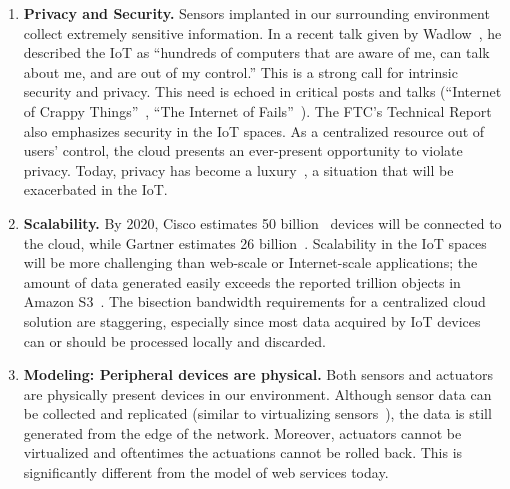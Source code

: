 \begin{enumerate}

\item \textbf{Privacy and Security.} Sensors implanted in our surrounding
  environment collect extremely sensitive information.  In a recent talk given
  by Wadlow~\cite{wadlow}, he described the IoT as ``hundreds of computers that
  are aware of me, can talk about me, and are out of my control.''  This is a
  strong call for intrinsic security and privacy.  This need is echoed in
  critical posts and talks (``Internet of Crappy
  Things''~\cite{alex2015internet}, ``The Internet of
  Fails''~\cite{stanislav2014the}).  The FTC's Technical
  Report~\cite{ftc2015internet} also emphasizes security in the IoT spaces.  As
  a centralized resource out of users' control, the cloud presents an
  ever-present opportunity to violate privacy.  Today, privacy has become a
  luxury~\cite{angwin2014has}, a situation that will be exacerbated in the IoT.

\item \textbf{Scalability.} By 2020, Cisco estimates 50
  billion~\cite{evans2011internet} devices will be connected to the cloud, while
  Gartner estimates 26 billion~\cite{middleton2013forecast}. Scalability in the
  IoT spaces will be more challenging than web-scale or Internet-scale
  applications; the amount of data generated easily exceeds the reported
  trillion objects in Amazon S3~\cite{barr2013amazon}. The bisection bandwidth
  requirements for a centralized cloud solution are staggering, especially since
  most data acquired by IoT devices can or should be processed locally and
  discarded.

\item \textbf{Modeling: Peripheral devices are physical.}  Both sensors and
  actuators are physically present devices in our environment.  Although sensor
  data can be collected and replicated (similar to virtualizing
  sensors~\cite{yuriyama2010sensor}), the data is still generated from the edge
  of the network.  Moreover, actuators cannot be virtualized and oftentimes the
  actuations cannot be rolled back.  This is significantly different from the
  model of web services today.


\end{enumerate}
